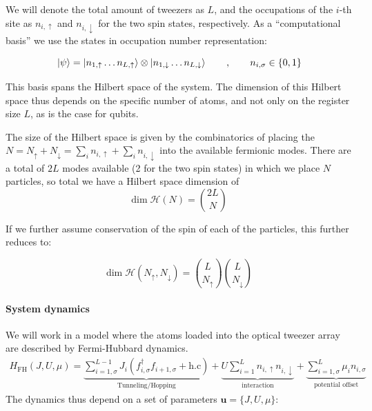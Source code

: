 \documentclass[a4paper, 10pt]{article}
\begin{document}
We will denote the total amount of tweezers as $L$, and the occupations of the $i$-th site as $n_{i,\uparrow}$ and $n_{i,\downarrow}$ for the two spin states, respectively. 
As a ``computational basis'' we use the states in occupation number representation:

\begin{equation}
    \ket{\psi} = \ket{n_{1,\uparrow} \dots n_{L,\uparrow}}  \otimes \ket{n_{1,\downarrow} \dots n_{L,\downarrow} } \qquad , \qquad n_{i, \sigma} \in \{0, 1 \}
\end{equation}

This basis spans the Hilbert space of the system.
The dimension of this Hilbert space thus depends on the specific number of atoms, and not only on the register size $L$, as is the case for qubits.

The size of the Hilbert space is given by the combinatorics of placing the $N = N_\uparrow  + N_\downarrow = \sum_i n_{i,\uparrow} + \sum_i n_{i,\downarrow}$ into the available fermionic modes.
There are a total of $2L$ modes available (2 for the two spin states) in which we place $N$ particles, so total we have a Hilbert space dimension of
 \begin{equation}
    \label{eqn:hilbert_dim_number}
    \text{dim}\; \mathcal{H}\left( N \right) = {2L \choose N}
\end{equation}

If we further assume conservation of the spin of each of the particles, this further reduces to:

    \begin{equation}
        \label{eqn:hilbert_dim_spin}
        \text{dim}\; \mathcal{H} \left( N_\uparrow, N_\downarrow \right) = {L \choose N_\uparrow}  {L \choose N_\downarrow}
    \end{equation}
        
\paragraph{System dynamics}        
We will work in a model where the atoms loaded into the optical tweezer array are described by Fermi-Hubbard dynamics. 
\begin{align}
    \label{eq:fermi-hubbard-hamiltonian}
    H_{\text{FH}}(J,U,\mu) =  \underbrace{\sum_{i=1,\sigma}^{L-1} J_i (f^\dag_{i,\sigma} f_{i+1,\sigma} + \text{h.c})}_{\text{Tunneling/Hopping}} + \underbrace{U \sum_{i=1}^{L}  n_{i,\uparrow}n_{i,\downarrow}}_{\text{interaction}} + \underbrace{\sum_{i=1,\sigma}^{L} \mu_i n_{i,\sigma}}_{\text{potential offset}} 
\end{align}
The dynamics thus depend on a set of parameters $\boldsymbol{u} = \{ J, U, \mu\}$:
\end{document}
